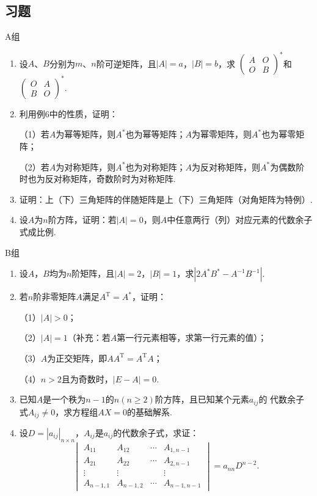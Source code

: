 \subsection{习题}
\centerline{\heiti A组}
\begin{enumerate}
	\item 设$A$、$B$分别为$m$、$n$阶可逆矩阵，且$|A|=a$，$|B|=b$，求
	$\begin{pmatrix}
		A & O \\ O & B
	\end{pmatrix}^*$和$\begin{pmatrix}
		O & A \\ B & O
	\end{pmatrix}^*$.
	\item 利用例6中的性质，证明：
	
	（1）若$A$为幂等矩阵，则$A^*$也为幂等矩阵；$A$为幂零矩阵，则$A^*$也为幂零矩阵；

	（2）若$A$为对称矩阵，则$A^*$也为对称矩阵；$A$为反对称矩阵，则$A^*$为偶数阶时也为反对称矩阵，奇数阶时为对称矩阵.
	\item 证明：上（下）三角矩阵的伴随矩阵是上（下）三角矩阵（对角矩阵为特例）.
	\item 设$A$为$n$阶方阵，证明：若$|A|=0$，则$A$中任意两行（列）对应元素的代数余子式成比例.
\end{enumerate}

\centerline{\heiti B组}
\begin{enumerate}
	\item 设$A$，$B$均为$n$阶矩阵，且$|A|=2$，$|B|=1$，求$|2A^*B^*-A^{-1}B^{-1}|$.
	\item 若$n$阶非零矩阵$A$满足$A^\mathrm{T}=A^*$，证明：
	
	（1）$|A|>0$；

	（2）$|A|=1$（补充：若$A$第一行元素相等，求第一行元素的值）；

	（3）$A$为正交矩阵，即$AA^\mathrm{T}=A^\mathrm{T}A$；

	（4）$n>2$且为奇数时，$|E-A|=0$.
	\item 已知$A$是一个秩为$n-1$的$n(n \ge 2)$阶方阵，且已知某个元素$a_{ij}$的
	代数余子式$A_{ij} \neq 0$，求方程组$AX=0$的基础解系.
	\item 设$D=|a_{ij}|_{n \times n}$，$A_{ij}$是$a_{ij}$的代数余子式，求证：
	$$\begin{vmatrix}
		A_{11} & A_{12} & \cdots & A_{1,n-1} \\
		A_{21} & A_{22} & \cdots & A_{2,n-1} \\
		\vdots & \vdots &  & \vdots \\
		A_{n-1,1} & A_{n-1,2} & \cdots & A_{n-1,n-1}
	\end{vmatrix}=a_{nn}D^{n-2}.$$
\end{enumerate}

